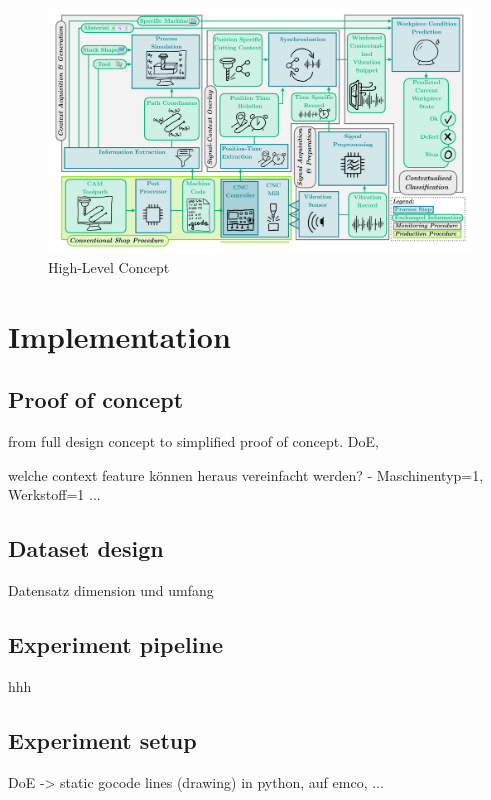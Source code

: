 \documentclass[5p,times,procedia]{elsarticle}
\begin{document}
\begin{figure}[t]
    \centering
    \includegraphics[width=0.99\linewidth]{ConceptDiagram.pdf}
    \caption{High-Level Concept}
    \label{Fig_ConceptDiagram}
\end{figure}
 
\section{Implementation}
\subsection{Proof of concept}
\vspace*{-\baselineskip}
from full design concept to simplified proof of concept.
DoE,  

welche context feature können heraus vereinfacht werden? - Maschinentyp=1, Werkstoff=1 ...



\subsection{Dataset design}
\vspace*{-\baselineskip}
Datensatz dimension und umfang

\subsection{Experiment pipeline}
\vspace*{-\baselineskip}
hhh

\subsection{Experiment setup}
\vspace*{-\baselineskip}
DoE -> static gocode lines (drawing) 
in python, auf emco, ...
\end{document}
